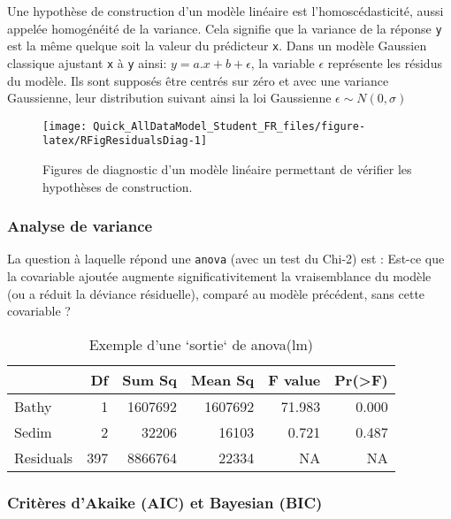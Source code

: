 \documentclass[french,a4paper]{article}
\begin{document}
Une hypothèse de construction d'un modèle linéaire est
l'homoscédasticité, aussi appelée homogénéité de la variance. Cela
signifie que la variance de la réponse \texttt{y} est la même quelque
soit la valeur du prédicteur \texttt{x}. Dans un modèle Gaussien
classique ajustant \texttt{x} à \texttt{y} ainsi:
\(y = a.x + b + \epsilon\), la variable \(\epsilon\) représente les
résidus du modèle. Ils sont supposés être centrés sur zéro et avec une
variance Gaussienne, leur distribution suivant ainsi la loi Gaussienne
\(\epsilon \sim N(0, \sigma)\)




\begin{figure}[!h]

{\centering \texttt{[image: Quick\_AllDataModel\_Student\_FR\_files/figure-latex/RFigResidualsDiag-1]} 

}

\caption{Figures de diagnostic d'un modèle linéaire
permettant de vérifier les hypothèses de construction.}\label{fig:RFigResidualsDiag}
\end{figure}

\hypertarget{analyse-de-variance}{%
\subsubsection{Analyse de variance}\label{analyse-de-variance}}

La question à laquelle répond une \texttt{anova} (avec un test du Chi-2)
est : Est-ce que la covariable ajoutée augmente significativitement la
vraisemblance du modèle (ou a réduit la déviance résiduelle), comparé au
modèle précédent, sans cette covariable ?

\begin{table}

\caption{\label{tab:RTableAnova}Exemple d'une `sortie` de anova(lm)}
\centering
\begin{tabular}[t]{l|r|r|r|r|r}
\hline
  & Df & Sum Sq & Mean Sq & F value & Pr(>F)\\
\hline
Bathy & 1 & 1607692 & 1607692 & 71.983 & 0.000\\
\hline
Sedim & 2 & 32206 & 16103 & 0.721 & 0.487\\
\hline
Residuals & 397 & 8866764 & 22334 & NA & NA\\
\hline
\end{tabular}
\end{table}

\hypertarget{criteres-dakaike-aic-et-bayesian-bic}{%
\subsubsection{Critères d'Akaike (AIC) et Bayesian
(BIC)}\label{criteres-dakaike-aic-et-bayesian-bic}}
\end{document}

